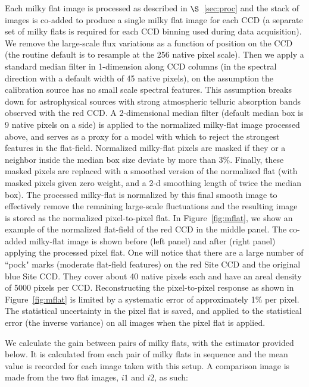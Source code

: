 \documentclass[12pt,preprint]{aastex}
\begin{document}
Each milky flat image is processed as described in $\S$~\ref{sec:proc}
and the stack of images is co-added to produce a single milky flat image 
for each CCD 
(a separate set of milky flats is required for each 
CCD binning used during data acquisition).
We remove the large-scale flux variations as a function of position on the
CCD (the routine default is to resample at the 256 native pixel scale).
Then we apply a standard median filter in 1-dimension along CCD columns
(in the spectral direction with a default width of 45 native pixels),
on the assumption the calibration source has no small scale spectral features.
This assumption breaks down for astrophysical sources with 
strong atmospheric telluric absorption bands observed with the red CCD.
A 2-dimensional median filter (default median box is 9 native pixels on a side)
is applied to the normalized milky-flat image processed above,
and serves as a proxy for a model with which to reject the strongest features 
in the flat-field.  Normalized milky-flat pixels are masked if they or a 
neighbor inside the median box size deviate by more than 3\%.  Finally, these masked
pixels are replaced with a smoothed version of the normalized flat (with masked pixels given zero weight, and a 2-d smoothing length of twice the median box).  
The processed milky-flat is normalized by this final smooth image to 
effectively remove the remaining large-scale fluctuations and the resulting 
image is stored as the normalized pixel-to-pixel flat.  
In Figure~\ref{fig:mflat}, we 
show an example of the normalized flat-field of the red CCD in the middle panel.
The co-added milky-flat image is shown before (left panel) and after 
(right panel) applying the processed pixel flat.  
One will notice that there are a large number of ``pock" marks 
(moderate flat-field features) on the red Site CCD and 
the original blue Site CCD.  They cover about 40 native pixels each and have an 
areal density of 5000 pixels per CCD.    
Reconstructing the pixel-to-pixel response as shown in Figure~\ref{fig:mflat} 
is limited by a systematic error of approximately 1\% per pixel.
The statistical uncertainty in the pixel flat is saved, and applied to
the statistical error (the inverse variance) on all images when 
the pixel flat is applied.

We calculate the gain between pairs of milky flats, with the estimator
provided below.  It is calculated from each pair of milky flats in 
sequence and the mean value is recorded for each image taken with this setup.
A comparison image is made from the two flat images, $i1$ and $i2$, as such:
\end{document}
